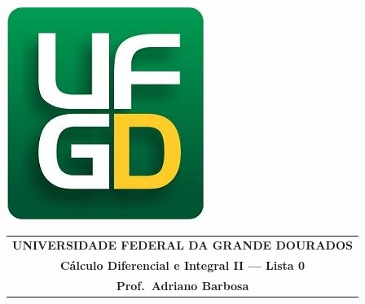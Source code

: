 \documentclass[a4paper,5pt]{amsbook}
\begin{document}
\thispagestyle{empty}
\pagestyle{empty}
\begin{minipage}[h]{0.14\textwidth}
	\includegraphics[scale=0.24]{../../ufgd.png}
\end{minipage}
\begin{minipage}[h]{\textwidth}
\begin{tabular}{c}
{{\bf UNIVERSIDADE FEDERAL DA GRANDE DOURADOS}}\\
{{\bf C\'alculo Diferencial e Integral II --- Lista 0}}\\
{{\bf Prof.\ Adriano Barbosa}}\\
\end{tabular}
\vspace{-0.45cm}
%
\end{minipage}

\end{document}

